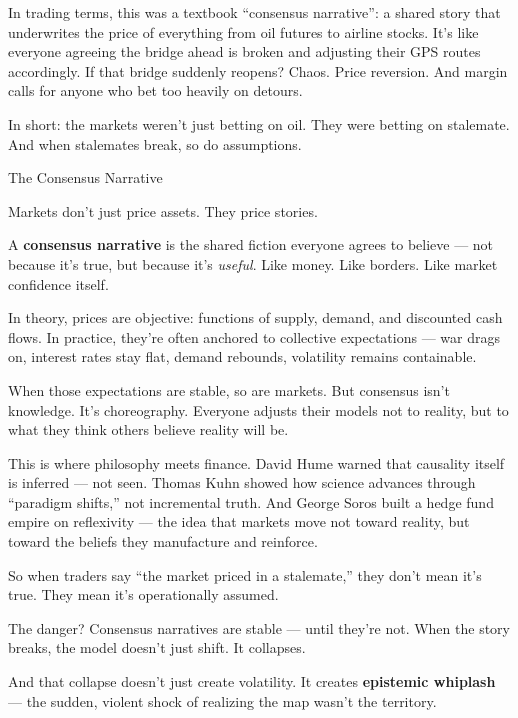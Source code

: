 \medskip

In trading terms, this was a textbook ``consensus narrative'': a shared story that underwrites the price of everything 
from oil futures to airline stocks. It’s like everyone agreeing the bridge ahead is broken and adjusting their GPS 
routes accordingly. If that bridge suddenly reopens? Chaos. Price reversion. And margin calls for anyone who bet too 
heavily on detours.

In short: the markets weren't just betting on oil.
They were betting on stalemate.
And when stalemates break, so do assumptions.

\medskip

\begin{PhilosophicalSidebar}{The Consensus Narrative}

  Markets don’t just price assets.  
  They price stories.

  \medskip
  
  A \textbf{consensus narrative} is the shared fiction everyone agrees to believe — not because it's true, but because 
  it’s \textit{useful}.  Like money. Like borders. Like market confidence itself.
  
  \medskip

  In theory, prices are objective: functions of supply, demand, and discounted cash flows.  
  In practice, they’re often anchored to collective expectations — war drags on, interest rates stay flat, demand rebounds, 
  volatility remains containable.

  \medskip
  
  When those expectations are stable, so are markets.  
  But consensus isn’t knowledge. It’s choreography.  
  Everyone adjusts their models not to reality, but to what they think others believe reality will be.
  
  \medskip
  
  This is where philosophy meets finance.  
  David Hume warned that causality itself is inferred — not seen.  
  Thomas Kuhn showed how science advances through “paradigm shifts,” not incremental truth.  
  And George Soros built a hedge fund empire on reflexivity — the idea that markets move not toward reality, but toward the 
  beliefs they manufacture and reinforce.
  
  \medskip
  
  So when traders say “the market priced in a stalemate,” they don’t mean it’s true.  
  They mean it’s operationally assumed.

  \medskip
  
  The danger?  
  Consensus narratives are stable — until they’re not.  
  When the story breaks, the model doesn’t just shift.  
  It collapses.  

  \medskip
  
  And that collapse doesn’t just create volatility.  
  It creates \textbf{epistemic whiplash} — the sudden, violent shock of realizing the map wasn’t the territory.
  
\end{PhilosophicalSidebar}


